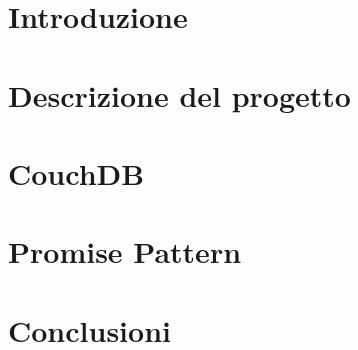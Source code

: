 \thispagestyle{empty}

\clearpage{\pagestyle{plain}\cleardoublepage}
\tableofcontents


\clearpage{\pagestyle{plain}\cleardoublepage} %

%


\clearpage{\pagestyle{plain}\cleardoublepage}
\chapter{Introduzione}


\clearpage{\pagestyle{plain}\cleardoublepage}
\chapter{Descrizione del progetto}
\label{cha:descrizione}


\clearpage{\pagestyle{plain}\cleardoublepage}
\chapter{CouchDB}
\label{cha:CouchDB}


\clearpage{\pagestyle{plain}\cleardoublepage}
\chapter{Promise Pattern}
\label{cha:analisi_framework}


\clearpage{\pagestyle{plain}\cleardoublepage}
\chapter{Conclusioni}
\label{cha:conclusioni}





